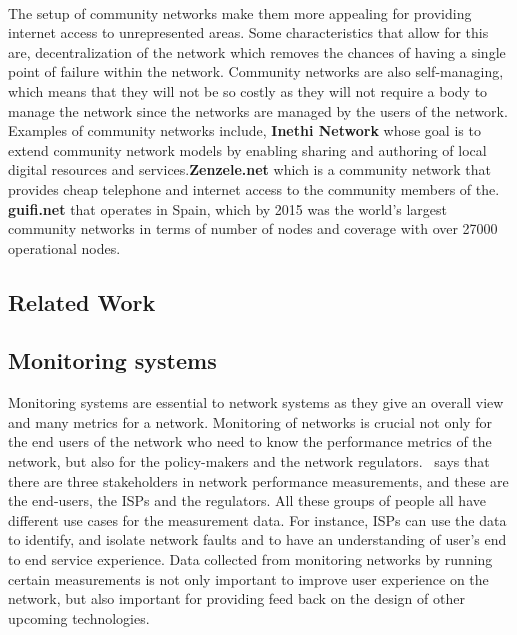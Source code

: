 \paragraph{}The setup of community networks make them more appealing for providing internet access to unrepresented areas.
Some characteristics that allow for this are, decentralization of the network\cite{Selimi:2014:TAD:2723218.2723265} which removes the chances of having a single point of failure within the network.
Community networks are also self-managing\cite{Braem:2013:CRC:2500098.2500108}, which means that they will not be so costly as they will not require a body to manage the network since the networks are managed by the users of the network.
Examples of community networks include, \textbf{Inethi Network} whose goal is to extend community network models by enabling sharing and authoring of local digital resources and services\cite{inethi_technologies}.\textbf{Zenzele.net} which is a community network that provides cheap telephone and internet access to the community members of the\cite{zenzeleni.net}.
\textbf{guifi.net} that operates in Spain\cite{guifi}, which by 2015 was the world's largest community networks in terms of number of nodes and coverage with over 27000 operational nodes\cite{2015:TOG:2852375.2852741}.

\subsection{Related Work}\label{subsec:prior-research}
\subsection{Monitoring systems}\label{subsec:monitoring-systems}
Monitoring systems are essential to network systems as they give an overall view and many metrics for a network.
Monitoring of networks is crucial not only for the end users of the network who need to know the performance metrics of the network, but also for the policy-makers and the network regulators\cite{7523537}.
~\cite{7076582}says that there are three stakeholders in network performance measurements, and these are the end-users, the ISPs and the regulators.
All these groups of people all have different use cases for the measurement data.
For instance, ISPs can use the data to identify, and isolate network faults and to have an understanding of user's end to end service experience\cite{Ford:2018:RWR:3243157.3243167}.
Data collected from monitoring networks by running certain measurements is not only important to improve user experience on the network, but also important for providing feed back on the design of other upcoming technologies\cite{7523537}.
